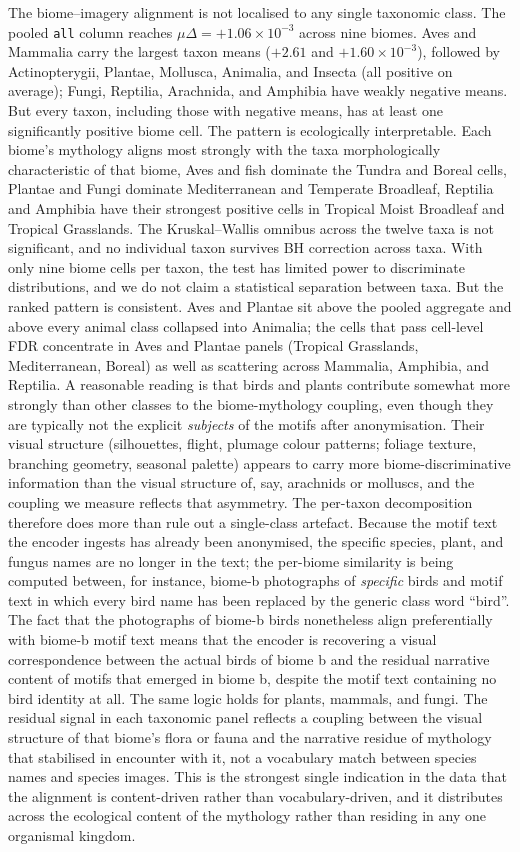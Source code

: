 \documentclass[11pt,a4paper]{article}
\begin{document}
The biome--imagery alignment is not localised to any single
taxonomic class. The pooled \texttt{all} column reaches
$\mu\Delta = +1.06\times 10^{-3}$ across nine biomes. Aves and
Mammalia carry the largest taxon means ($+2.61$ and $+1.60\times
10^{-3}$), followed by Actinopterygii, Plantae, Mollusca, Animalia,
and Insecta (all positive on average); Fungi, Reptilia, Arachnida,
and Amphibia have weakly negative means. But every taxon, including
those with negative means, has at least one significantly positive
biome cell. The pattern is ecologically interpretable. Each biome's
mythology aligns most strongly with the taxa morphologically
characteristic of that biome, Aves and fish dominate the Tundra
and Boreal cells, Plantae and Fungi dominate Mediterranean and
Temperate Broadleaf, Reptilia and Amphibia have their strongest
positive cells in Tropical Moist Broadleaf and Tropical Grasslands. The Kruskal--Wallis omnibus across the twelve taxa is
not significant, and no individual taxon
survives BH correction across taxa. With only nine biome cells per taxon, the
test has limited power to discriminate distributions, and we do not
claim a statistical separation between taxa. But the ranked pattern
is consistent. Aves and Plantae sit above the pooled aggregate and
above every animal class collapsed into Animalia; the cells that
pass cell-level FDR concentrate in Aves and Plantae panels (Tropical
Grasslands, Mediterranean, Boreal) as well as scattering across
Mammalia, Amphibia, and Reptilia. A reasonable reading is that
birds and plants contribute somewhat more strongly than other
classes to the biome-mythology coupling, even though they are
typically not the explicit \emph{subjects} of the motifs after
anonymisation. Their visual structure (silhouettes, flight,
plumage colour patterns; foliage texture, branching geometry,
seasonal palette) appears to carry more biome-discriminative
information than the visual structure of, say, arachnids or
molluscs, and the coupling we measure reflects that asymmetry. The
per-taxon decomposition therefore does more than rule out a
single-class artefact. Because the motif text the encoder
ingests has already been anonymised, the specific species, plant,
and fungus names are no longer in the text; the per-biome similarity
is being computed between, for instance, biome-b photographs of
\emph{specific} birds and motif text in which every bird name has
been replaced by the generic class word ``bird''. The
fact that the photographs of biome-b birds nonetheless align
preferentially with biome-b motif text means that the encoder is
recovering a visual correspondence between the actual birds of biome
b and the residual narrative content of motifs that emerged in biome
b, despite the motif text containing no bird identity at all. The
same logic holds for plants, mammals, and fungi. The residual signal
in each taxonomic panel reflects a coupling between the visual
structure of that biome's flora or fauna and the narrative residue
of mythology that stabilised in encounter with it, not a vocabulary
match between species names and species images. This is the
strongest single indication in the data that the alignment is
content-driven rather than vocabulary-driven, and it distributes
across the ecological content of the mythology rather than residing
in any one organismal kingdom.
\end{document}
